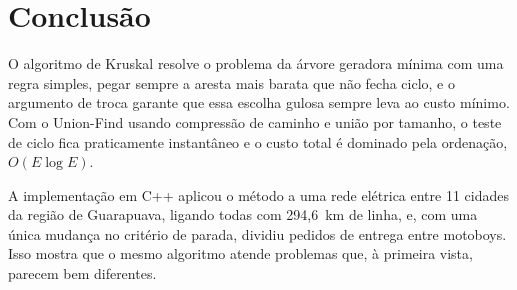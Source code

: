 \documentclass[a4paper]{article}
\begin{document}
\section{Conclusão}
O algoritmo de Kruskal resolve o problema da árvore geradora mínima com uma regra
simples, pegar sempre a aresta mais barata que não fecha ciclo, e o argumento de
troca garante que essa escolha gulosa sempre leva ao custo mínimo. Com o
Union-Find usando compressão de caminho e união por tamanho, o teste de ciclo
fica praticamente instantâneo e o custo total é dominado pela ordenação,
$O(E \log E)$.

A implementação em C++ aplicou o método a uma rede elétrica entre 11 cidades da
região de Guarapuava, ligando todas com 294,6~km de linha, e, com uma única
mudança no critério de parada, dividiu pedidos de entrega entre motoboys. Isso
mostra que o mesmo algoritmo atende problemas que, à primeira vista, parecem bem
diferentes.

\nocite{fiset2017intro,fiset2017ops,fiset2017path,fiset2017kruskal}
\end{document}
